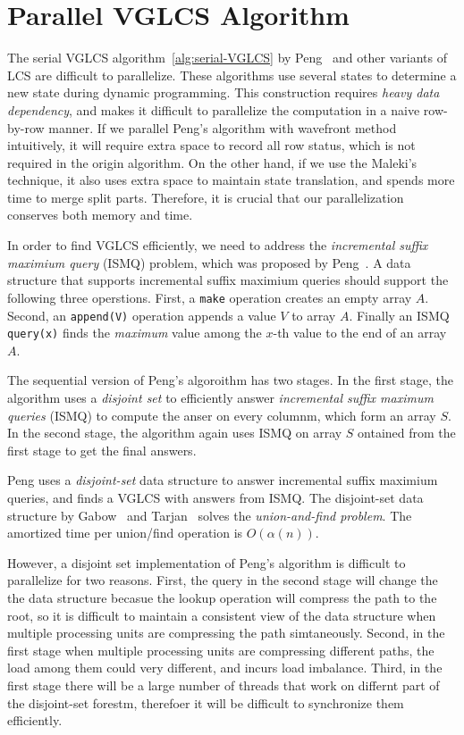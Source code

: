 \section{Parallel VGLCS Algorithm} %
\label{sec:parallelVGLCS}

The serial VGLCS algorithm~\ref{alg:serial-VGLCS} by
Peng~\cite{Peng2011TheLC} and other variants of LCS are difficult to
parallelize.  These algorithms use several states to determine a new
state during dynamic programming.  This construction requires {\em
  heavy data dependency}, and makes it difficult to parallelize the
computation in a naive row-by-row manner.  If we parallel Peng's
algorithm with wavefront method intuitively, it will require extra
space to record all row status, which is not required in the origin
algorithm.  On the other hand, if we use the
Maleki's~\cite{Maleki2016EfficientPU} technique, it also uses extra
space to maintain state translation, and spends more time to merge
split parts.  Therefore, it is crucial that our parallelization
conserves both memory and time.



In order to find VGLCS efficiently, we need to address the {\em
  incremental suffix maximium query} (ISMQ) problem, which was
proposed by Peng~\cite{Peng2011TheLC}.  A data structure that supports
incremental suffix maximium queries should support the following three
operstions.  First, a {\tt make} operation creates an empty array $A$.
Second, an {\tt append(V)} operation appends a value $V$ to array $A$.
Finally an ISMQ {\tt query(x)} finds the {\em maximum} value among the
$x$-th value to the end of an array $A$.

The sequential version of Peng's algoroithm has two stages.  In the
first stage, the algorithm uses a {\em disjoint set} to efficiently
answer {\em incremental suffix maximum queries} (ISMQ) to compute the
anser on every columnm, which form an array $S$.  In the second stage,
the algorithm again uses ISMQ on array $S$ ontained from the first
stage to get the final answers.

Peng uses a {\em disjoint-set} data structure to answer incremental
suffix maximium queries, and finds a VGLCS with answers from ISMQ.
The disjoint-set data structure by Gabow~\cite{Gabow1983ALA} and
Tarjan~\cite{Tarjan1975EfficiencyOA} solves the {\em union-and-find
  problem}.  The amortized time per union/find operation is
$O(\alpha(n))$.

However, a disjoint set implementation of Peng's algorithm is
difficult to parallelize for two reasons.  First, the query in the
second stage will change the the data structure becasue the lookup
operation will compress the path to the root, so it is difficult to
maintain a consistent view of the data structure when multiple
processing units are compressing the path simtaneously.  Second, in
the first stage when multiple processing units are compressing
different paths, the load among them could very different, and incurs
load imbalance.  Third, in the first stage there will be a large
number of threads that work on differnt part of the disjoint-set
forestm, therefoer it will be difficult to synchronize them
efficiently.

